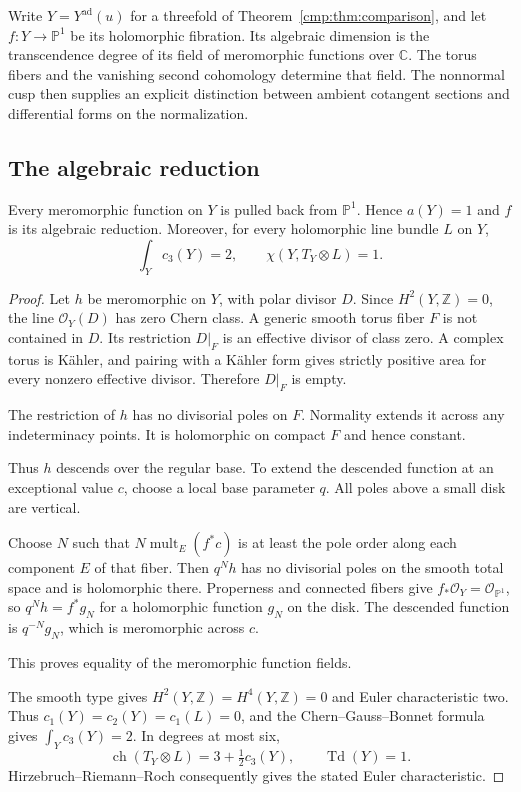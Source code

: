 \documentclass[11pt]{article}
\numberwithin{equation}{section}
\begin{document}
Write $Y=Y^{\mathrm{ad}}(u)$ for a threefold of
Theorem~\ref{cmp:thm:comparison}, and let $f:Y\to\mathbb P^1$ be
its holomorphic fibration. Its algebraic dimension is the
transcendence degree of its field of meromorphic functions over
$\mathbb C$. The torus fibers and the vanishing second cohomology
determine that field. The nonnormal cusp then supplies an explicit
distinction between ambient cotangent sections and differential
forms on the normalization.

\subsection{The algebraic reduction}

\begin{proposition}\label{ad:prop:reduction}
Every meromorphic function on $Y$ is pulled back from
$\mathbb P^1$. Hence $a(Y)=1$ and $f$ is its algebraic reduction.
Moreover, for every holomorphic line bundle $L$ on $Y$,
\[
 \int_Y c_3(Y)=2,\qquad \chi(Y,T_Y\otimes L)=1.
\]
\end{proposition}

\begin{proof}
Let $h$ be meromorphic on $Y$, with polar divisor $D$. Since
$H^2(Y,\mathbb Z)=0$, the line $\mathcal O_Y(D)$ has zero Chern
class. A generic smooth torus fiber $F$ is not contained in $D$.
Its restriction $D|_F$ is an effective divisor of class zero. A
complex torus is K\"ahler, and pairing with a K\"ahler form gives
strictly positive area for every nonzero effective divisor.
Therefore $D|_F$ is empty.

The restriction of $h$ has no divisorial
poles on $F$. Normality extends it across any indeterminacy points.
It is holomorphic on compact $F$ and hence constant.

Thus $h$ descends over the regular base. To extend the descended
function at an exceptional value $c$, choose a local base parameter
$q$. All poles above a small disk are vertical.

Choose $N$ such that
$N\operatorname{mult}_E(f^*c)$ is at least the pole order along
each component $E$ of that fiber. Then $q^Nh$ has no divisorial
poles on the smooth total space and is holomorphic there. Properness
and connected fibers give $f_*\mathcal O_Y=\mathcal O_{\mathbb P^1}$,
so $q^Nh=f^*g_N$ for a holomorphic function $g_N$ on the disk.
The descended function is $q^{-N}g_N$, which is meromorphic across
$c$.

This proves equality of the meromorphic function fields.

The smooth type gives $H^2(Y,\mathbb Z)=H^4(Y,\mathbb Z)=0$ and
Euler characteristic two. Thus $c_1(Y)=c_2(Y)=c_1(L)=0$, and the
Chern--Gauss--Bonnet formula gives $\int_Yc_3(Y)=2$.
In degrees at most six,
\[
 \operatorname{ch}(T_Y\otimes L)=3+\tfrac12c_3(Y),
 \qquad \operatorname{Td}(Y)=1.
\]
Hirzebruch--Riemann--Roch consequently gives the stated Euler
characteristic.
\end{proof}
\end{document}
